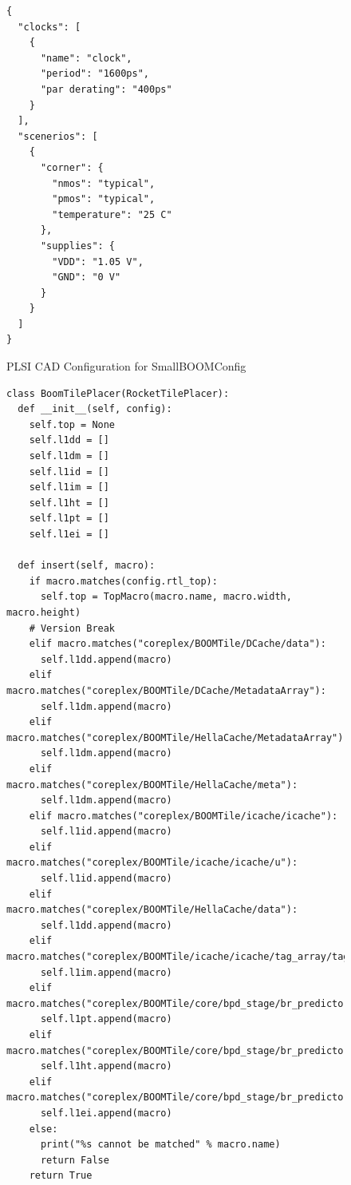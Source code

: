 \documentclass{article}
\begin{document}
\begin{figure}
  \begin{verbatim}
{
  "clocks": [
    {
      "name": "clock",
      "period": "1600ps",
      "par derating": "400ps"
    }
  ],
  "scenerios": [
    {
      "corner": {
        "nmos": "typical",
        "pmos": "typical",
        "temperature": "25 C"
      },
      "supplies": {
        "VDD": "1.05 V",
        "GND": "0 V"
      }
    }
  ]
}
\end{verbatim}
  \caption{PLSI CAD Configuration for SmallBOOMConfig}
  \label{res:boom-config}
\end{figure}

\begin{figure}
\tiny
\begin{verbatim}
class BoomTilePlacer(RocketTilePlacer):
  def __init__(self, config):
    self.top = None
    self.l1dd = []
    self.l1dm = []
    self.l1id = []
    self.l1im = []
    self.l1ht = []
    self.l1pt = []
    self.l1ei = []

  def insert(self, macro):
    if macro.matches(config.rtl_top):
      self.top = TopMacro(macro.name, macro.width, macro.height)
    # Version Break
    elif macro.matches("coreplex/BOOMTile/DCache/data"):
      self.l1dd.append(macro)
    elif macro.matches("coreplex/BOOMTile/DCache/MetadataArray"):
      self.l1dm.append(macro)
    elif macro.matches("coreplex/BOOMTile/HellaCache/MetadataArray"):
      self.l1dm.append(macro)
    elif macro.matches("coreplex/BOOMTile/HellaCache/meta"):
      self.l1dm.append(macro)
    elif macro.matches("coreplex/BOOMTile/icache/icache"):
      self.l1id.append(macro)
    elif macro.matches("coreplex/BOOMTile/icache/icache/u"):
      self.l1id.append(macro)
    elif macro.matches("coreplex/BOOMTile/HellaCache/data"):
      self.l1dd.append(macro)
    elif macro.matches("coreplex/BOOMTile/icache/icache/tag_array/tag_array"):
      self.l1im.append(macro)
    elif macro.matches("coreplex/BOOMTile/core/bpd_stage/br_predictor/counters/p_table/p_table/p_table"):
      self.l1pt.append(macro)
    elif macro.matches("coreplex/BOOMTile/core/bpd_stage/br_predictor/counters/h_table/h_table/h_table"):
      self.l1ht.append(macro)
    elif macro.matches("coreplex/BOOMTile/core/bpd_stage/br_predictor/brob/entries_info/entries_info"):
      self.l1ei.append(macro)
    else:
      print("%s cannot be matched" % macro.name)
      return False
    return True


\end{verbatim}
\end{figure}
\end{document}
